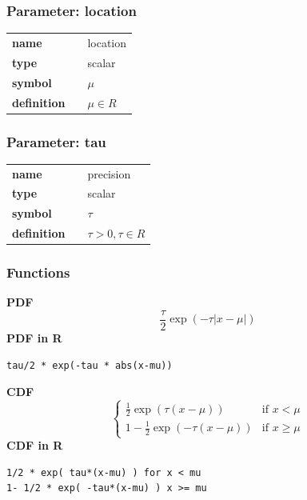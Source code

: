 \subsubsection*{Parameter: location}

\noindent\begin{tabular}{p{2cm}cl}
\textbf{name} & & location \\
\textbf{type} & & scalar \\
\textbf{symbol} & & $\mu$  \\
\textbf{definition} & & $\mu \in R$
\end{tabular}
\subsubsection*{Parameter: tau}

\noindent\begin{tabular}{p{2cm}cl}
\textbf{name} & & precision \\
\textbf{type} & & scalar \\
\textbf{symbol} & & $\tau$  \\
\textbf{definition} & & $\tau > 0, \tau \in R$
\end{tabular}
\subsubsection*{Functions}

\smallskip \noindent \hspace{.2cm} \textbf{PDF} 
\begin{equation*}\frac{\tau}{2} \exp \left(-\tau|x-\mu| \right)\end{equation*}
\smallskip \noindent \hspace{.2cm} \textbf{PDF in R}  
\begin{verbatim}tau/2 * exp(-tau * abs(x-mu))\end{verbatim}
\smallskip \noindent \hspace{.2cm} \textbf{CDF} 
\begin{equation*}\begin{cases}
\frac12 \exp \left( \tau (x-\mu) \right) & \mbox{if }x < \mu \\
1-\frac12 \exp \left( -\tau (x-\mu) \right) & \mbox{if }x \geq \mu
\end{cases}\end{equation*}
\smallskip \noindent \hspace{.2cm} \textbf{CDF in R} 
\begin{verbatim}1/2 * exp( tau*(x-mu) ) for x < mu
1- 1/2 * exp( -tau*(x-mu) ) x >= mu\end{verbatim}
\smallskip
